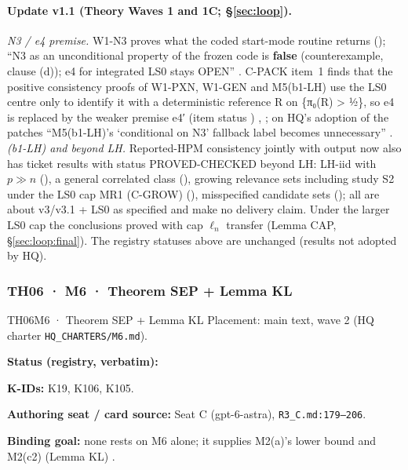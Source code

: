 \paragraph{Update v1.1 (Theory Waves 1 and 1C; \S\ref{sec:loop}).} \emph{N3 / e4 premise.} W1-N3 proves what the coded start-mode routine returns (); ``N3 as an unconditional property of the frozen code is \textbf{false} (counterexample, clause (d)); e4 for integrated LS0 stays OPEN'' . C-PACK item~1 finds that the positive consistency proofs of W1-PXN, W1-GEN and M5(b1-LH) use the LS0 centre only to identify it with a deterministic reference R on \{π₀(R) > ½\}, so e4 is replaced by the weaker premise e4′ (item status ) , ; on HQ's adoption of the patches ``M5(b1-LH)'s `conditional on N3' fallback label becomes unnecessary'' . \emph{(b1-LH) and beyond LH.} Reported-HPM consistency jointly with output now also has ticket results with status PROVED-CHECKED beyond LH: LH-iid with $p\gg n$ (), a general correlated class (), growing relevance sets including study S2 under the LS0 cap MR1 (C-GROW) (), misspecified candidate sets (); all are about v3/v3.1 + LS0 as specified and make no delivery claim. Under the larger LS0 cap the conclusions proved with cap $\ell_n$ transfer (Lemma CAP, \S\ref{sec:loop:final}). The registry statuses above are unchanged (results not adopted by HQ).

\subsubsection{TH06 · M6 · Theorem SEP + Lemma KL}\label{sec:th06}
\begin{card}{TH06}{M6 · Theorem SEP + Lemma KL}
\approvedFB\quad Placement: main text, wave 2 (HQ charter \texttt{HQ\_CHARTERS/M6.md}).\par
\textbf{Status (registry, verbatim):} \par
\textbf{K-IDs:} K19, K106, K105.\par
\textbf{Authoring seat / card source:} Seat C (gpt-6-astra), \texttt{R3\_C.md:179–206}.\par
\textbf{Binding goal:} none rests on M6 alone; it supplies M2(a)'s lower bound and M2(c2) (Lemma KL) .
\end{card}


